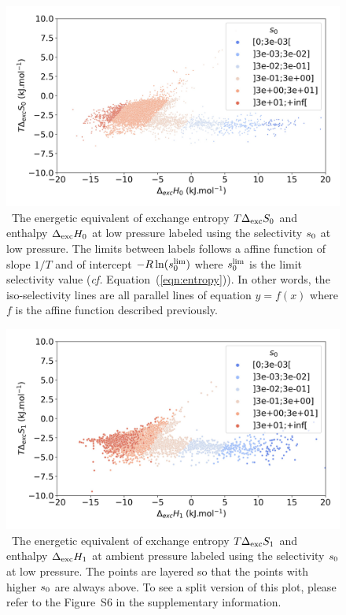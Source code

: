 \documentclass[main.tex]{subfiles}
\begin{document}
  
  \begin{figure}[t]
  \centering
    \includegraphics[width=\linewidth]{figures/2-thermo/enthalpy_entropy_0_s_0.jpg}
    \caption{\ The energetic equivalent of exchange entropy $T\Delta_{\text{exc}}S_{\text{0}}$ and enthalpy $\Delta_{\text{exc}}H_{\text{0}}$ at low pressure labeled using the selectivity $s_{\text{0}}$ at low pressure. The limits between labels follows a affine function of slope $1/T$ and of intercept $-R\ln(s_{\text{0}}^{\text{lim}})$ where $s_{\text{0}}^{\text{lim}}$ is the limit selectivity value (\emph{cf.} Equation~(\ref{eqn:entropy})). In other words, the iso-selectivity lines are all parallel lines of equation $y=f(x)$ where $f$ is the affine function described previously.}
    \label{fgr:HSplot_0}
  \end{figure}
  
  
  \begin{figure}[t]
  \centering
    \includegraphics[width=\linewidth]{figures/2-thermo/enthalpy_entropy_2080_s_0.jpg}
    \caption{\ The energetic equivalent of exchange entropy $T\Delta_{\text{exc}}S_{\text{1}}$ and enthalpy $\Delta_{\text{exc}}H_{\text{1}}$ at ambient pressure labeled using the selectivity $s_{\text{0}}$ at low pressure. The points are layered so that the points with higher $s_{\text{0}}$ are always above. To see a split version of this plot, please refer to the Figure~S6 in the supplementary information.}
    \label{fgr:HSplot_1}
  \end{figure}
  
\end{document}
